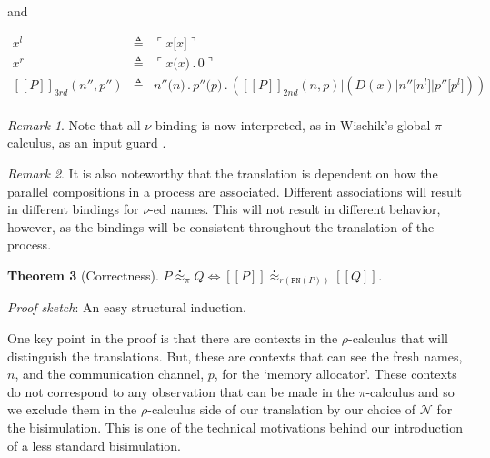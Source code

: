 \documentclass[]{amsart}
\newcommand{\ldb}{[\![}
\newcommand{\rdb}{]\!]}
\newcommand{\lpquote}{\ulcorner}
\newcommand{\rpquote}{\urcorner}
\newcommand{\id}[1]{\texttt{#1}}
\newcommand{\pzero}{\mathbin{0}}
\newcommand{\juxtap}{\mathbin{\id{|}}}
\newcommand{\concat}{\mathbin{.}}
\newcommand{\binpar}[2]{#1 \juxtap #2}
\newcommand{\outputp}[2]{#1 \id{[} #2 \id{]}}
\newcommand{\prefix}[3]{#1 \id{(} #2 \id{)} \concat #3}
\newcommand{\quotep}[1]{\lpquote #1 \rpquote}
\newcommand{\meaningof}[1]{\ldb #1 \rdb}
\newcommand{\wbbisim}{\stackrel{\centerdot}{\approx}} %
\newtheorem{thm}{Theorem}[subsection]
\theoremstyle{definition}
\theoremstyle{remark}
\newtheorem{rem}[thm]{Remark}
\numberwithin{equation}{subsection}
\newcommand{\pic}{$\pi$-calculus}
\newcommand{\rhoc}{$\rho$-calculus}
\begin{document}
and

\begin{eqnarray*}
	x^{l} & \triangleq & \quotep{\outputp{x}{x}} \\
	x^{r} & \triangleq & \quotep{\prefix{x}{x}{\pzero}} \\
	\meaningof{P}_{3rd}( n'', p'' ) 
		& \triangleq & 
			\prefix{n''}{n}{\prefix{p''}{p}{(\binpar{\meaningof{P}_{2nd}(  n, p )}
							        {(\binpar{D(x)}{\binpar{\outputp{n''}{n^{l}}}{\outputp{p''}{p^{l}}}})})}} \\
\end{eqnarray*}

\begin{rem}
	Note that all $\nu$-binding is now interpreted, as in Wischik's
	global $\pi$-calculus, as an input guard \cite{globalpi}.
\end{rem}
	
\begin{rem}
	It is also noteworthy that the translation is dependent on how
	the parallel compositions in a process are
	associated. Different associations will result in different
	bindings for $\nu$-ed names. This will not result in different
	behavior, however, as the bindings will be consistent
	throughout the translation of the process.
\end{rem}

\begin{thm}[Correctness]	
	$P \wbbisim_{\pi} Q \iff \ldb P \rdb \wbbisim_{r(\texttt{FN}(P))} \ldb Q \rdb$.
\end{thm}

\emph{Proof sketch}: An easy structural induction.

One key point in the proof is that there are contexts in the {\rhoc}
that will distinguish the translations. But, these are contexts that
can see the fresh names, $n$, and the communication channel, $p$, for
the `memory allocator'. These contexts do not correspond to any
observation that can be made in the {\pic} and so we exclude them in
the {\rhoc} side of our translation by our choice of ${\mathcal N}$
for the bisimulation. This is one of the technical motivations behind
our introduction of a less standard bisimulation.
\end{document}
